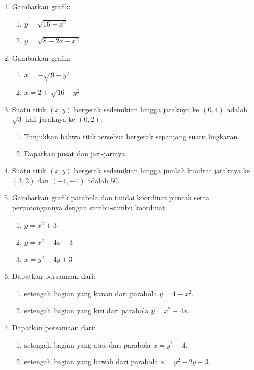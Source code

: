 \documentclass[12pt]{article}
\begin{document}
\begin{enumerate}
    \item Gambarkan grafik:
    \begin{enumerate}
        \item $y = \sqrt{16 - x^2}$
        \item $y = \sqrt{8 - 2x - x^2}$
    \end{enumerate}

    \item Gambarkan grafik:
    \begin{enumerate}
        \item $x = -\sqrt{9 - y^2}$
        \item $x = 2 + \sqrt{16 - y^2}$
    \end{enumerate}

    \item Suatu titik $(x,y)$ bergerak sedemikian hingga jaraknya ke $(0, 4)$ adalah $\sqrt{3}$ kali jaraknya ke $(0, 2)$.
    \begin{enumerate}
        \item Tunjukkan bahwa titik tersebut bergerak sepanjang suatu lingkaran.
        \item Dapatkan pusat dan jari-jarinya.
    \end{enumerate}

    \item Suatu titik $(x,y)$ bergerak sedemikian hingga jumlah kuadrat jaraknya ke $(3, 2)$ dan $(-1, -4)$ adalah $50$.

    \item Gambarkan grafik parabola dan tandai koordinat puncak serta perpotongannya dengan sumbu-sumbu koordinat:
    \begin{enumerate}
        \item $y = x^2 + 3$
        \item $y = x^2 - 4x + 3$
        \item $x = y^2 - 4y + 3$
    \end{enumerate}

    \item Dapatkan persamaan dari:
    \begin{enumerate}
        \item setengah bagian yang kanan dari parabola $y = 4 - x^2$.
        \item setengah bagian yang kiri dari parabola $y = x^2 + 4x$.
    \end{enumerate}

    \item Dapatkan persamaan dari:
    \begin{enumerate}
        \item setengah bagian yang atas dari parabola $x = y^2 - 4$.
        \item setengah bagian yang bawah dari parabola $x = y^2 - 2y - 3$.
    \end{enumerate}
\end{enumerate}
\end{document}
